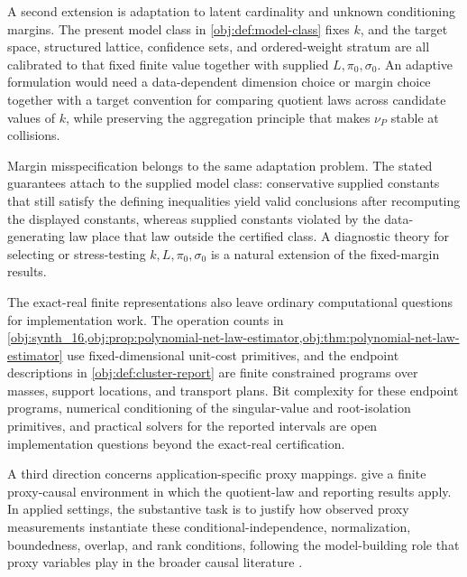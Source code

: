 A second extension is adaptation to latent cardinality and unknown conditioning margins. The present model class in \cref{obj:def:model-class} fixes \(k\), and the target space, structured lattice, confidence sets, and ordered-weight stratum are all calibrated to that fixed finite value together with supplied \(L,\pi_0,\sigma_0\). An adaptive formulation would need a data-dependent dimension choice or margin choice together with a target convention for comparing quotient laws across candidate values of \(k\), while preserving the aggregation principle that makes \(\nu_P\) stable at collisions.

Margin misspecification belongs to the same adaptation problem. The stated guarantees attach to the supplied model class: conservative supplied constants that still satisfy the defining inequalities yield valid conclusions after recomputing the displayed constants, whereas supplied constants violated by the data-generating law place that law outside the certified class. A diagnostic theory for selecting or stress-testing \(k,L,\pi_0,\sigma_0\) is a natural extension of the fixed-margin results.

The exact-real finite representations also leave ordinary computational questions for implementation work. The operation counts in \cref{obj:synth_16,obj:prop:polynomial-net-law-estimator,obj:thm:polynomial-net-law-estimator} use fixed-dimensional unit-cost primitives, and the endpoint descriptions in \cref{obj:def:cluster-report} are finite constrained programs over masses, support locations, and transport plans. Bit complexity for these endpoint programs, numerical conditioning of the singular-value and root-isolation primitives, and practical solvers for the reported intervals are open implementation questions beyond the exact-real certification.

A third direction concerns application-specific proxy mappings.  give a finite proxy-causal environment in which the quotient-law and reporting results apply. In applied settings, the substantive task is to justify how observed proxy measurements instantiate these conditional-independence, normalization, boundedness, overlap, and rank conditions, following the model-building role that proxy variables play in the broader causal literature \citep{VirkMazaheriWu2026,VanAmsterdamEtAl2022}.
